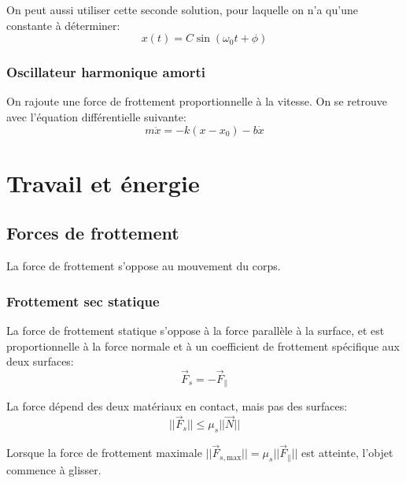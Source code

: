 \documentclass{article}
\numberwithin{equation}{section}
\begin{document}
On peut aussi utiliser cette seconde solution, pour laquelle on n'a qu'une constante à déterminer:
\begin{equation}
	\boxed{ x(t) = C \sin(\omega_0 t + \phi) }
\end{equation}

\subsubsection{Oscillateur harmonique amorti}
On rajoute une force de frottement proportionnelle à la vitesse. On se retrouve avec l'équation différentielle suivante:
\begin{equation}
	\boxed{ m \ddot x = - k(x - x_0) - b \dot x }
\end{equation}



\section{Travail et énergie}

\subsection{Forces de frottement}
La force de frottement s'oppose au mouvement du corps.

\subsubsection{Frottement sec statique}
La force de frottement statique s'oppose à la force parallèle à la surface, et est proportionnelle à la force normale et à un coefficient de frottement spécifique aux deux surfaces:
\begin{equation*}
	\vec F_s = - \vec F_\parallel
\end{equation*}

La force dépend des deux matériaux en contact, mais pas des surfaces:
\begin{equation}
	\boxed{ ||\vec F_s|| \leq \mu_s||\vec N|| }
\end{equation}

Lorsque la force de frottement maximale \( || \vec F_{s, \text{max}} || = \mu_s || \vec F_\parallel ||\) est atteinte, l'objet commence à glisser. 
\end{document}
